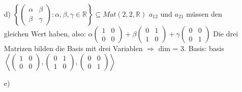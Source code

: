 \documentclass{article}
\begin{document}
\begin{enumerate}
        \item[d)]
        $\left\{\left(\begin{array}{cc}\alpha&\beta\\\beta&\gamma\end{array}\right)
        :\alpha,\beta,\gamma\in\mathbb{R}\right\}\subseteq Mat(2,2,\mathbb{R})$
        \newline
        $a_{12}$ und $a_{21}$ müssen den gleichen Wert haben, also:
        \newline
        $\alpha\left(\begin{array}{cc}1&0\\0&0\end{array}\right)+
        \beta\left(\begin{array}{cc}0&1\\1&0\end{array}\right)+
        \gamma\left(\begin{array}{cc}0&0\\0&1\end{array}\right)$
        \newline
        Die drei Matrizen bilden die Basis mit drei Variablen $\Rightarrow$ dim = 3. 
        \newline
        Basis: basis$\left<\left(\begin{array}{cc}1&0\\0&0\end{array}\right),
        \left(\begin{array}{cc}0&1\\1&0\end{array}\right),
        \left(\begin{array}{cc}0&0\\0&1\end{array}\right)\right>$

        \item[e)]

    \end{enumerate}
\end{document}
